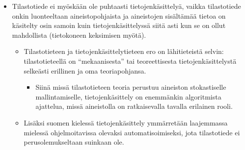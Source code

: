 \documentclass[
]{book}
\providecommand{\tightlist}{%
  \setlength{\itemsep}{0pt}\setlength{\parskip}{0pt}}
\begin{document}
\hfill\break
\hfill\break

\begin{itemize}
\tightlist
\item
  Tilastotiede ei myöskään ole puhtaasti tietojenkäsittelyä, vaikka tilastotiede onkin luonteeltaan aineistopohjaista ja aineistojen sisältämää tietoa on käsitelty osin samoin kuin tietojenkäsittelyssä siitä asti kun se on ollut mahdollista (tietokoneen keksimisen myötä).

  \begin{itemize}
  \tightlist
  \item
    Tilastotieteen ja tietojenkäsittelytieteen ero on lähitieteistä selvin: tilastotieteellä on ``mekaanisesta'' tai teoreettisesta tietojenkäsittelystä selkeästi erillinen ja oma teoriapohjansa.

    \begin{itemize}
    \tightlist
    \item
      Siinä missä tilastotieteen teoria perustuu aineiston stokastiselle mallintamiselle, tietojenkäsittely on enemmänkin algoritmista ajattelua, missä aineistolla on ratkaisevalla tavalla erilainen rooli.
    \end{itemize}
  \item
    Lisäksi suomen kielessä tietojenkäsittely ymmärretään laajemmassa mielessä ohjelmoitavissa olevaksi automatisoimiseksi, jota tilastotiede ei perusolemukseltaan suinkaan ole.
  \end{itemize}
\end{itemize}

\hfill\break
\hfill\break
\end{document}
